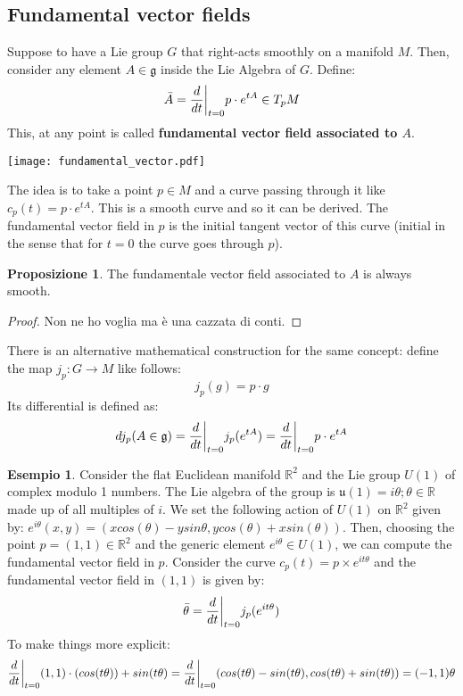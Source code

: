 \documentclass[12pt,a4paper]{report}
\theoremstyle{definition}
\theoremstyle{Theorem}
\newtheorem{Prop}[Def]{Proposizione}
\theoremstyle{definition}
\newtheorem{Ex}[Def]{Esempio}
\theoremstyle{definition}
\theoremstyle{definition}
\begin{document}
		\subsection{Fundamental vector fields}
		Suppose to have a Lie group $G$ that right-acts smoothly on a manifold $M$. Then, consider any element $A\in\mathfrak{g}$ inside the Lie Algebra of $G$. Define:
		$$\bar{A}={d\over dt}\bigg|_{t=0}p\cdot e^{tA}\in T_pM$$
		This, at any point is called \textbf{fundamental vector field associated to $A$}.\\
		\begin{center}
			\texttt{[image: fundamental\_vector.pdf]}
		\end{center}
		The idea is to take a point $p\in M$ and a curve passing through it like $c_p(t)=p\cdot e^{tA}$. This is a smooth curve and so it can be derived. The fundamental vector field in $p$ is the initial tangent vector of this curve (initial in the sense that for $t=0$ the curve goes through $p$).
		\begin{Prop}
			The fundamentale vector field associated to $A$ is always smooth.
		\end{Prop}
		\begin{proof}
			Non ne ho voglia ma è una cazzata di conti.
		\end{proof}
		There is an alternative mathematical construction for the same concept: define the map $j_p:G\rightarrow M$ like follows:
		$$j_p(g)=p\cdot g$$
		Its differential is defined as:
		$$dj_p(A\in\mathfrak{g})={d\over dt}\bigg|_{t=0}j_p(e^{tA})={d\over dt}\bigg|_{t=0}p\cdot e^{tA}$$
		\begin{Ex}
			Consider the flat Euclidean manifold $\mathbb{R}^2$ and the Lie group $U(1)$ of complex modulo 1 numbers. The Lie algebra of the group is $\mathfrak{u}(1)={i\theta;\theta\in\mathbb{R}}$ made up of all multiples of $i$. We set the following action of $U(1)$ on $\mathbb{R}^2$ given by: $e^{i\theta}(x,y)=(xcos(\theta)-ysin\theta,ycos(\theta)+xsin(\theta))$.
			Then, choosing the point $p=(1,1)\in\mathbb{R}^2$ and the generic element $e^{i\theta}\in U(1)$, we can compute the fundamental vector field in $p$. Consider the curve $c_p(t)=p\times e^{it\theta}$ and the fundamental vector field in $(1,1)$ is given by:
			$$\bar{\theta}={d\over dt}\bigg|_{t=0}j_p(e^{it\theta})$$
			To make things more explicit:
			$${d\over dt}\bigg|_{t=0}(1,1)\cdot (cos(t\theta))+sin(t\theta)=
			{d\over dt}\bigg|_{t=0}(cos(t\theta)-sin(t\theta),cos(t\theta)+sin(t\theta))=(-1,1)\theta$$
		\end{Ex}
\end{document}
